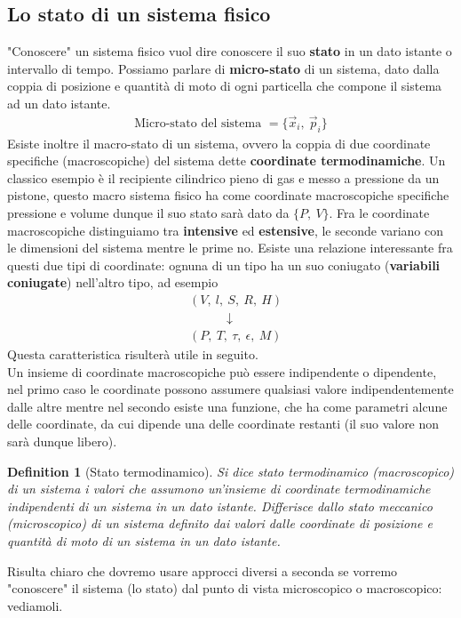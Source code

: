 \documentclass[10pt,a4paper]{article}
\newtheorem{definition}{Definition}
\begin{document}
	\subsection{Lo stato di un sistema fisico}
		"Conoscere" un sistema fisico vuol dire conoscere il suo \textbf{stato} in un dato istante o intervallo di tempo.
		Possiamo parlare di \textbf{micro-stato} di un sistema, dato dalla coppia di posizione e quantità di moto di ogni particella che compone il sistema ad un dato istante. 
		\begin{align*} 
			\text{Micro-stato del sistema } = \{ \vec{x}_i,\ \vec{p}_i\}
		\end{align*} 
		Esiste inoltre il macro-stato di un sistema, ovvero la coppia di due coordinate specifiche (macroscopiche) del sistema dette \textbf{coordinate termodinamiche}. Un classico esempio è il recipiente cilindrico pieno di gas e messo a pressione da un pistone, questo macro sistema fisico ha come coordinate macroscopiche specifiche pressione e volume dunque il suo stato sarà dato da $\{P,\ V\}$. Fra le coordinate macroscopiche distinguiamo tra \textbf{intensive} ed \textbf{estensive}, le seconde variano con le dimensioni del sistema mentre le prime no. Esiste una relazione interessante fra questi due tipi di coordinate: ognuna di un tipo ha un suo coniugato (\textbf{variabili coniugate}) nell'altro tipo, ad esempio 
		\begin{align*} 
			&(V,\ l ,\ S,\ R,\ H)\\
			&\quad \quad \quad \downarrow\\
			&(P,\ T,\ \tau,\ \epsilon,\ M)
		\end{align*} 
		Questa caratteristica risulterà utile in seguito.\\
		Un insieme di coordinate macroscopiche può essere indipendente o dipendente, nel primo caso le coordinate possono assumere qualsiasi valore indipendentemente dalle altre mentre nel secondo esiste una funzione, che ha come parametri alcune delle coordinate, da cui dipende una delle coordinate restanti (il suo valore non sarà dunque libero). 
		\begin{definition}[Stato termodinamico]
			Si dice stato termodinamico (macroscopico) di un sistema i valori che assumono un'insieme di coordinate termodinamiche indipendenti di un sistema in un dato istante. Differisce dallo stato meccanico (microscopico) di un sistema definito dai valori dalle coordinate di posizione e quantità di moto di un sistema in un dato istante. 
		\end{definition}
		Risulta chiaro che dovremo usare approcci diversi a seconda se vorremo "conoscere" il sistema (lo stato) dal punto di vista microscopico o macroscopico: vediamoli. 
\end{document}
